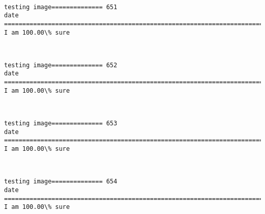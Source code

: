 \documentclass[11pt]{article}
\begin{document}
    \begin{center}
    \end{center}
    { \hspace*{\fill} \\}
    
    \begin{Verbatim}[commandchars=\\\{\}]
testing image============== 651
date
============================================================================
I am 100.00\% sure

    \end{Verbatim}

    \begin{center}
    \end{center}
    { \hspace*{\fill} \\}
    
    \begin{Verbatim}[commandchars=\\\{\}]
testing image============== 652
date
============================================================================
I am 100.00\% sure

    \end{Verbatim}

    \begin{center}
    \end{center}
    { \hspace*{\fill} \\}
    
    \begin{Verbatim}[commandchars=\\\{\}]
testing image============== 653
date
============================================================================
I am 100.00\% sure

    \end{Verbatim}

    \begin{center}
    \end{center}
    { \hspace*{\fill} \\}
    
    \begin{Verbatim}[commandchars=\\\{\}]
testing image============== 654
date
============================================================================
I am 100.00\% sure

    \end{Verbatim}
\end{document}
